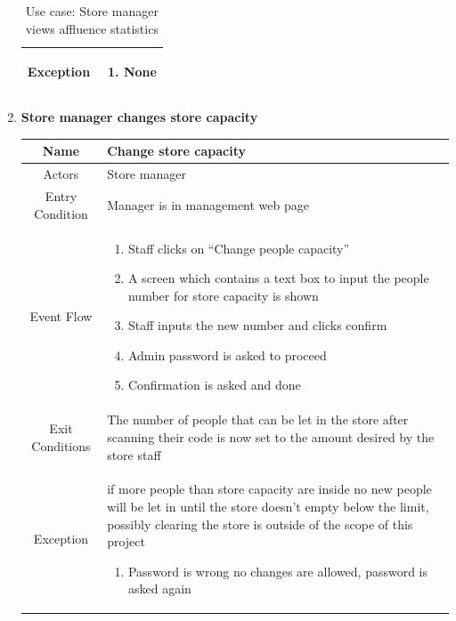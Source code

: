 \begin{enumerate}
\begin{table}[H]
{\begin{tabular}{|c|p{14cm}|}
			Exception & \begin{enumerate}
				\item None
				
			\end{enumerate}\\
			
			\hline
		\end{tabular}
	}
	\label{tab:UCStatistic}
	\caption{Use case: Store manager views affluence statistics}
\end{table}

\item \textbf{Store manager changes store capacity}

\begin{table}[H]
	{
		\begin{tabular}{|c|p{14cm}|}
			\hline
			Name & Change store capacity\\
			\hline
			Actors & Store manager\\
			\hline
			Entry Condition & Manager is in management web page\\
			\hline
			
			Event Flow & \begin{enumerate}
				\item Staff clicks on “Change people capacity”
				\item A screen which contains a text box to input the people number for store capacity is shown
				\item Staff inputs the new number and clicks confirm
				\item Admin password is asked to proceed
				\item Confirmation is asked and done
				
				
			\end{enumerate}\\
			
			\hline
			Exit Conditions & The number of people that can be let in the store after scanning their code is now set to the amount desired by the store staff\\
			\hline
			
			Exception & if more people than store capacity are inside no new people will be let in until the store doesn’t empty below the limit, possibly clearing the store is outside of the scope of this project\newline
			\begin{enumerate}
				\item Password is wrong\newline
				no changes are allowed, password is asked again
				

\end{enumerate}
\end{tabular}}
\end{table}
\end{enumerate}
